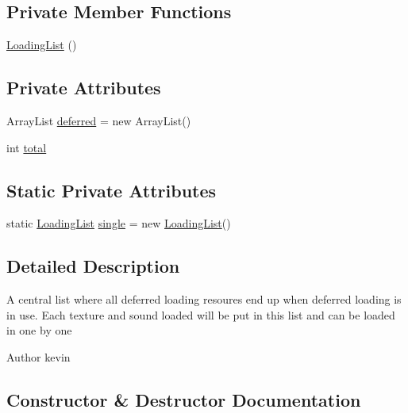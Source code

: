 \subsection*{Private Member Functions}
\begin{DoxyCompactItemize}
\item 
\mbox{\hyperlink{classorg_1_1newdawn_1_1slick_1_1loading_1_1_loading_list_ae5e62f48158e42b7488b25eb2f8de27a}{Loading\+List}} ()
\end{DoxyCompactItemize}
\subsection*{Private Attributes}
\begin{DoxyCompactItemize}
\item 
Array\+List \mbox{\hyperlink{classorg_1_1newdawn_1_1slick_1_1loading_1_1_loading_list_a5ec264187931448fbcf900ccf59bab72}{deferred}} = new Array\+List()
\item 
int \mbox{\hyperlink{classorg_1_1newdawn_1_1slick_1_1loading_1_1_loading_list_a26a2808de2c1171ed883cc89831b0332}{total}}
\end{DoxyCompactItemize}
\subsection*{Static Private Attributes}
\begin{DoxyCompactItemize}
\item 
static \mbox{\hyperlink{classorg_1_1newdawn_1_1slick_1_1loading_1_1_loading_list}{Loading\+List}} \mbox{\hyperlink{classorg_1_1newdawn_1_1slick_1_1loading_1_1_loading_list_ae4a959a966e43388d21307e80e2ae329}{single}} = new \mbox{\hyperlink{classorg_1_1newdawn_1_1slick_1_1loading_1_1_loading_list}{Loading\+List}}()
\end{DoxyCompactItemize}


\subsection{Detailed Description}
A central list where all deferred loading resoures end up when deferred loading is in use. Each texture and sound loaded will be put in this list and can be loaded in one by one

\begin{DoxyAuthor}{Author}
kevin 
\end{DoxyAuthor}


\subsection{Constructor \& Destructor Documentation}
\mbox{\label{classorg_1_1newdawn_1_1slick_1_1loading_1_1_loading_list_ae5e62f48158e42b7488b25eb2f8de27a}} 
